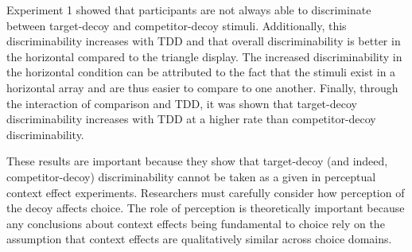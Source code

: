 Experiment 1 showed that participants are not always able to discriminate between target-decoy and competitor-decoy stimuli. Additionally, this discriminability increases with TDD and that overall discriminability is better in the horizontal compared to the triangle display. The increased discriminability in the horizontal condition can be attributed to the fact that the stimuli exist in a horizontal array and are thus easier to compare to one another. Finally, through the interaction of comparison and TDD, it was shown that target-decoy discriminability increases with TDD at a higher rate than competitor-decoy discriminability. 





These results are important because they show that target-decoy (and indeed, competitor-decoy) discriminability cannot be taken as a given in perceptual context effect experiments. Researchers must carefully consider how perception of the decoy affects choice. The role of perception is theoretically important because any conclusions about context effects being fundamental to choice \parencite{trueblood2013not} rely on the assumption that context effects are qualitatively similar across choice domains.

